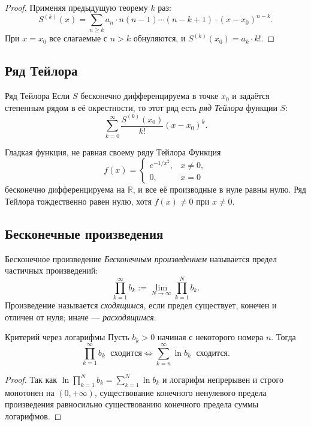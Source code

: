 \begin{proof}
	Применяя предыдущую теорему $k$ раз:
	\[
	S^{(k)}(x)=\sum_{n\ge k}a_n\cdot n(n-1)\cdots(n-k+1)\cdot(x-x_0)^{n-k}.
	\]
	При $x=x_0$ все слагаемые с $n>k$ обнуляются, и $S^{(k)}(x_0)=a_k\cdot k!$.
\end{proof}

\subsection{Ряд Тейлора}

\begin{Definition}{Ряд Тейлора}{}
	Если $S$ бесконечно дифференцируема в точке $x_0$ и задаётся степенным рядом
	в её окрестности, то этот ряд есть \emph{ряд Тейлора} функции $S$:
	\[
	\sum_{k=0}^{\infty}\frac{S^{(k)}(x_0)}{k!}(x-x_0)^k.
	\]
\end{Definition}

\begin{Example}{Гладкая функция, не равная своему ряду Тейлора}{}
	Функция
	\[
	f(x)=\begin{cases}e^{-1/x^2},&x\ne0,\\0,&x=0\end{cases}
	\]
	бесконечно дифференцируема на $\mathbb R$, и все её производные в нуле равны нулю.
	Ряд Тейлора тождественно равен нулю, хотя $f(x)\ne0$ при $x\ne0$.
\end{Example}

\subsection{Бесконечные произведения}

\begin{Definition}{Бесконечное произведение}{}
	\emph{Бесконечным произведением} называется предел частичных произведений:
	\[
	\prod_{k=1}^{\infty}b_k:=\lim_{N\to\infty}\prod_{k=1}^{N}b_k.
	\]
	Произведение называется \emph{сходящимся}, если предел существует, конечен и отличен от нуля;
	иначе --- \emph{расходящимся}.
\end{Definition}

\begin{Statement}{Критерий через логарифмы}{}
	Пусть $b_k>0$ начиная с некоторого номера $n$. Тогда
	\[
	\prod_{k=1}^{\infty}b_k\;\text{ сходится}
	\iff
	\sum_{k=n}^{\infty}\ln b_k\;\text{ сходится}.
	\]
\end{Statement}

\begin{proof}
	Так как $\ln\prod_{k=1}^{N}b_k=\sum_{k=1}^{N}\ln b_k$ и логарифм непрерывен и строго монотонен
	на $(0,+\infty)$, существование конечного ненулевого предела произведения равносильно
	существованию конечного предела суммы логарифмов.
\end{proof}

